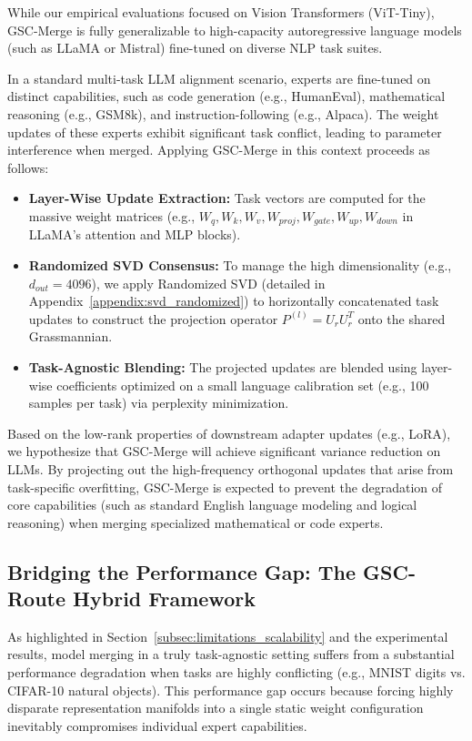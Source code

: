 \documentclass{article}
\theoremstyle{plain}
\theoremstyle{definition}
\theoremstyle{remark}
\begin{document}
While our empirical evaluations focused on Vision Transformers (ViT-Tiny), GSC-Merge is fully generalizable to high-capacity autoregressive language models (such as LLaMA or Mistral) fine-tuned on diverse NLP task suites. 

In a standard multi-task LLM alignment scenario, experts are fine-tuned on distinct capabilities, such as code generation (e.g., HumanEval), mathematical reasoning (e.g., GSM8k), and instruction-following (e.g., Alpaca). The weight updates of these experts exhibit significant task conflict, leading to parameter interference when merged. Applying GSC-Merge in this context proceeds as follows:
\begin{itemize}
    \item \textbf{Layer-Wise Update Extraction:} Task vectors are computed for the massive weight matrices (e.g., $W_{q}, W_{k}, W_{v}, W_{proj}, W_{gate}, W_{up}, W_{down}$ in LLaMA's attention and MLP blocks).
    \item \textbf{Randomized SVD Consensus:} To manage the high dimensionality (e.g., $d_{out} = 4096$), we apply Randomized SVD (detailed in Appendix~\ref{appendix:svd_randomized}) to horizontally concatenated task updates to construct the projection operator $P^{(l)} = U_r U_r^T$ onto the shared Grassmannian.
    \item \textbf{Task-Agnostic Blending:} The projected updates are blended using layer-wise coefficients optimized on a small language calibration set (e.g., 100 samples per task) via perplexity minimization.
\end{itemize}

Based on the low-rank properties of downstream adapter updates (e.g., LoRA), we hypothesize that GSC-Merge will achieve significant variance reduction on LLMs. By projecting out the high-frequency orthogonal updates that arise from task-specific overfitting, GSC-Merge is expected to prevent the degradation of core capabilities (such as standard English language modeling and logical reasoning) when merging specialized mathematical or code experts.

\subsection{Bridging the Performance Gap: The GSC-Route Hybrid Framework}

As highlighted in Section~\ref{subsec:limitations_scalability} and the experimental results, model merging in a truly task-agnostic setting suffers from a substantial performance degradation when tasks are highly conflicting (e.g., MNIST digits vs. CIFAR-10 natural objects). This performance gap occurs because forcing highly disparate representation manifolds into a single static weight configuration inevitably compromises individual expert capabilities.
\end{document}
